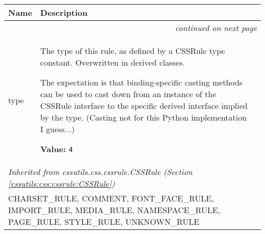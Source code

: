     \vspace{-1cm}
\hspace{\varindent}\begin{longtable}{|p{\varnamewidth}|p{\vardescrwidth}|l}
\cline{1-2}
\cline{1-2} \centering \textbf{Name} & \centering \textbf{Description}& \\
\cline{1-2}
\endhead\cline{1-2}\multicolumn{3}{r}{\small\textit{continued on next page}}\\\endfoot\cline{1-2}
\endlastfoot\raggedright t\-y\-p\-e\- & \raggedright The type of this rule, as defined by a CSSRule type constant.
Overwritten in derived classes.

The expectation is that binding-specific casting methods can be used to
cast down from an instance of the CSSRule interface to the specific
derived interface implied by the type.
(Casting not for this Python implementation I guess...)

\textbf{Value:} 
{\tt 4}&\\
\cline{1-2}
\multicolumn{2}{|l|}{\textit{Inherited from cssutils.css.cssrule.CSSRule \textit{(Section \ref{cssutils:css:cssrule:CSSRule})}}}\\
\multicolumn{2}{|p{\varwidth}|}{\raggedright CHARSET\_RULE, COMMENT, FONT\_FACE\_RULE, IMPORT\_RULE, MEDIA\_RULE, NAMESPACE\_RULE, PAGE\_RULE, STYLE\_RULE, UNKNOWN\_RULE}\\
\cline{1-2}
\end{longtable}

